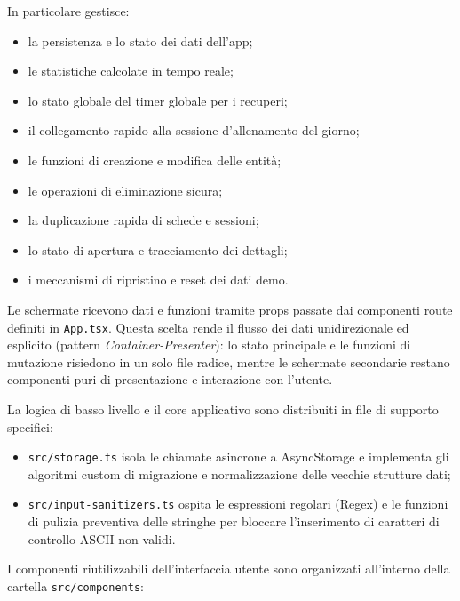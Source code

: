 \documentclass[11pt,a4paper]{article}
\begin{document}
In particolare gestisce:

\begin{itemize}
  \item la persistenza e lo stato dei dati dell'app;
  \item le statistiche calcolate in tempo reale;
  \item lo stato globale del timer globale per i recuperi;
  \item il collegamento rapido alla sessione d'allenamento del giorno;
  \item le funzioni di creazione e modifica delle entità;
  \item le operazioni di eliminazione sicura;
  \item la duplicazione rapida di schede e sessioni;
  \item lo stato di apertura e tracciamento dei dettagli;
  \item i meccanismi di ripristino e reset dei dati demo.
\end{itemize}

Le schermate ricevono dati e funzioni tramite props passate dai componenti route definiti in \texttt{App.tsx}. Questa scelta rende il flusso dei dati unidirezionale ed esplicito (pattern \textit{Container-Presenter}): lo stato principale e le funzioni di mutazione risiedono in un solo file radice, mentre le schermate secondarie restano componenti puri di presentazione e interazione con l'utente.

La logica di basso livello e il core applicativo sono distribuiti in file di supporto specifici:
\begin{itemize}
  \item \texttt{src/storage.ts} isola le chiamate asincrone a AsyncStorage e implementa gli algoritmi custom di migrazione e normalizzazione delle vecchie strutture dati;
  \item \texttt{src/input-sanitizers.ts} ospita le espressioni regolari (Regex) e le funzioni di pulizia preventiva delle stringhe per bloccare l'inserimento di caratteri di controllo ASCII non validi.
\end{itemize}

I componenti riutilizzabili dell'interfaccia utente sono organizzati all'interno della cartella \texttt{src/components}:
\end{document}
